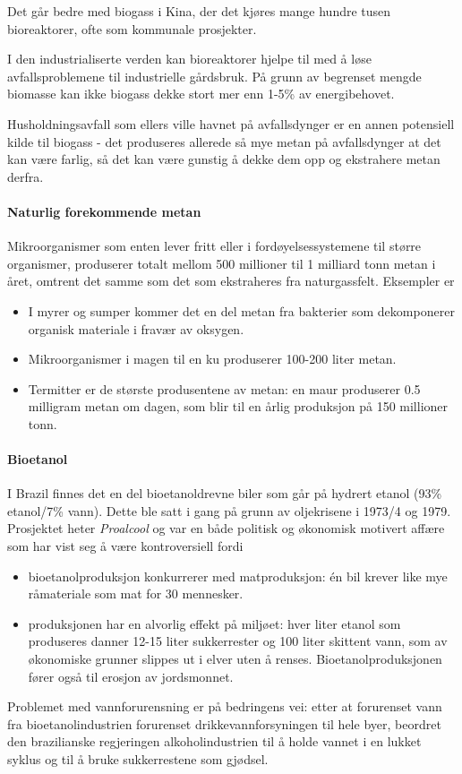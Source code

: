 Det går bedre med biogass i Kina, der det kjøres mange hundre tusen bioreaktorer, ofte som kommunale prosjekter.

I den industrialiserte verden kan bioreaktorer hjelpe til med å løse avfallsproblemene til industrielle gårdsbruk. På grunn av begrenset mengde biomasse kan ikke biogass dekke stort mer enn 1-5\% av energibehovet.

Husholdningsavfall som ellers ville havnet på avfallsdynger er en annen potensiell kilde til biogass - det produseres allerede så mye metan på avfallsdynger at det kan være farlig, så det kan være gunstig å dekke dem opp og ekstrahere metan derfra.

\paragraph{Naturlig forekommende metan} Mikroorganismer som enten lever fritt eller i fordøyelsessystemene til større organismer, produserer totalt mellom 500 millioner til 1 milliard tonn metan i året, omtrent det samme som det som ekstraheres fra naturgassfelt. Eksempler er
\begin{itemize}[nolistsep,noitemsep]
	\item I myrer og sumper kommer det en del metan fra bakterier som dekomponerer organisk materiale i fravær av oksygen.
	\item Mikroorganismer i magen til en ku produserer 100-200 liter metan.
	\item Termitter er de største produsentene av metan: en maur produserer 0.5 milligram metan om dagen, som blir til en årlig produksjon på 150 millioner tonn.
\end{itemize}

\paragraph{Bioetanol} I Brazil finnes det en del bioetanoldrevne biler som går på hydrert etanol (93\% etanol/7\% vann). Dette ble satt i gang på grunn av oljekrisene i 1973/4 og 1979. Prosjektet heter \emph{Proalcool} og var en både politisk og økonomisk motivert affære som har vist seg å være kontroversiell fordi
\begin{itemize}[noitemsep,nolistsep]
	\item bioetanolproduksjon konkurrerer med matproduksjon: én bil krever like mye råmateriale som mat for 30 mennesker.
	\item produksjonen har en alvorlig effekt på miljøet: hver liter etanol som produseres danner 12-15 liter sukkerrester og 100 liter skittent vann, som av økonomiske grunner slippes ut i elver uten å renses. Bioetanolproduksjonen fører også til erosjon av jordsmonnet.
\end{itemize}
Problemet med vannforurensning er på bedringens vei: etter at forurenset vann fra bioetanolindustrien forurenset drikkevannforsyningen til hele byer, beordret den brazilianske regjeringen alkoholindustrien til å holde vannet i en lukket syklus og til å bruke sukkerrestene som gjødsel.

